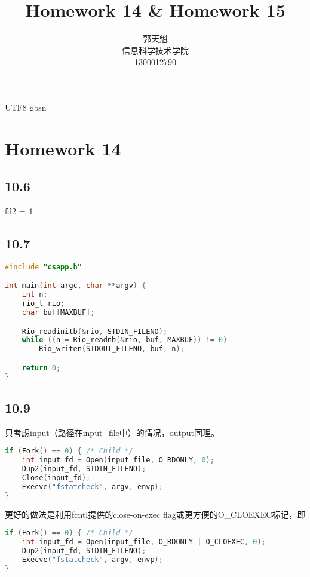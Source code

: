 \documentclass {article}
\begin{document}
  \begin {CJK*} {UTF8} {gbsn}
    \title {\textbf {\Huge Homework 14 \& Homework 15}}
		\author {郭天魁 \\ 信息科学技术学院 \\ 1300012790}

		\maketitle
		
		\section{Homework 14}
			\subsection{10.6}
				fd2 = 4
			
			\subsection{10.7}
				\begin{lstlisting}[language=C]
#include "csapp.h"

int main(int argc, char **argv) {
	int n;
	rio_t rio;
	char buf[MAXBUF];

	Rio_readinitb(&rio, STDIN_FILENO);
	while ((n = Rio_readnb(&rio, buf, MAXBUF)) != 0)
		Rio_writen(STDOUT_FILENO, buf, n);

	return 0;
}
				\end{lstlisting}

			\subsection{10.9}
				只考虑input（路径在input\_file中）的情况，output同理。

				\begin{lstlisting}[language=C]
if (Fork() == 0) { /* Child */
	int input_fd = Open(input_file, O_RDONLY, 0);
	Dup2(input_fd, STDIN_FILENO);
	Close(input_fd);
	Execve("fstatcheck", argv, envp);
}
				\end{lstlisting}

				更好的做法是利用fcntl提供的close-on-exec flag或更方便的O\_CLOEXEC标记，即

				\begin{lstlisting}[language=C]
if (Fork() == 0) { /* Child */
	int input_fd = Open(input_file, O_RDONLY | O_CLOEXEC, 0);
	Dup2(input_fd, STDIN_FILENO);
	Execve("fstatcheck", argv, envp);
}
				\end{lstlisting}
				

\end{CJK*}
\end{document}
